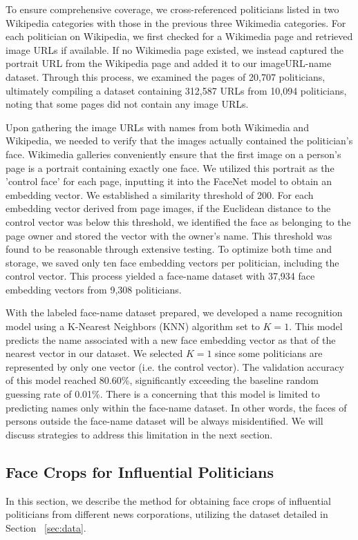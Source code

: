\documentclass[sigconf]{acmart}
\begin{document}
To ensure comprehensive coverage, we cross-referenced politicians listed in two Wikipedia categories with those in the previous three Wikimedia categories. For each politician on Wikipedia, we first checked for a Wikimedia page and retrieved image URLs if available. If no Wikimedia page existed, we instead captured the portrait URL from the Wikipedia page and added it to our imageURL-name dataset. Through this process, we examined the pages of 20,707 politicians, ultimately compiling a dataset containing 312,587 URLs from 10,094 politicians, noting that some pages did not contain any image URLs.

Upon gathering the image URLs with names from both Wikimedia and Wikipedia, we needed to verify that the images actually contained the politician's face. Wikimedia galleries conveniently ensure that the first image on a person’s page is a portrait containing exactly one face. We utilized this portrait as the 'control face' for each page, inputting it into the FaceNet model to obtain an embedding vector. We established a similarity threshold of 200. For each embedding vector derived from page images, if the Euclidean distance to the control vector was below this threshold, we identified the face as belonging to the page owner and stored the vector with the owner's name. This threshold was found to be reasonable through extensive testing. To optimize both time and storage, we saved only ten face embedding vectors per politician, including the control vector. This process yielded a face-name dataset with 37,934 face embedding vectors from 9,308 politicians.


With the labeled face-name dataset prepared, we developed a name recognition model using a K-Nearest Neighbors (KNN) algorithm set to \(K=1\). This model predicts the name associated with a new face embedding vector as that of the nearest vector in our dataset. We selected \(K=1\) since some politicians are represented by only one vector (i.e. the control vector). The validation accuracy of this model reached 80.60\%, significantly exceeding the baseline random guessing rate of 0.01\%. There is a concerning that this model is limited to predicting names only within the face-name dataset. In other words, the faces of persons outside the face-name dataset will be always misidentified. We will discuss strategies to address this limitation in the next section.



\subsection{Face Crops for Influential Politicians} \label{sec:facecrops}
In this section, we describe the method for obtaining face crops of influential politicians from different news corporations, utilizing the dataset detailed in Section ~\ref{sec:data}. 
\end{document}
